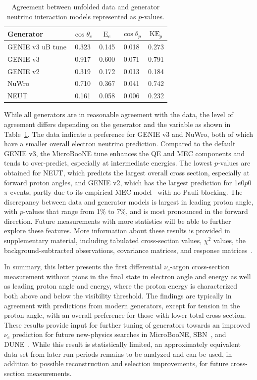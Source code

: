 \documentclass[reprint,
 amsmath,amssymb,
 aps,prd,
 superscriptaddress,
 twocolumn, longbibliography
]{revtex4-1}
\newcommand{\nue}{$\nu_e$\xspace}
\newcommand{\zpsel}{1$e$0$p$0$\pi$\xspace}
\begin{document}
\begin{table}
 \caption{\label{tab:pvals} Agreement between unfolded data and generator neutrino interaction models represented as $p$-values. }
\begin{tabular}{l c c c c} 
 \hline \hline
  Generator & $\cos \theta_{e}$ & $\textrm{E}_{e}$ & $\cos \theta_{p}$ & $\textrm{KE}_{p}$\\ \hline 
 GENIE v3 uB tune & 0.323 & 0.145 & 0.018 & 0.273\\ 
 GENIE v3 & 0.917 & 0.600 & 0.071 & 0.791\\ 
 GENIE v2 & 0.319 & 0.172 & 0.013 & 0.184\\ 
NuWro & 0.710 & 0.367 & 0.041 & 0.742\\ 
NEUT & 0.161 & 0.058 & 0.006 & 0.232\\ 
 \hline \hline
\end{tabular}
\end{table}

While all generators are in reasonable agreement with the data, the level of agreement differs depending on the generator and the variable as shown in Table~\ref{tab:pvals}.
The data indicate a preference for GENIE v3 and NuWro, both of which have a smaller overall electron neutrino prediction.
Compared to the default GENIE v3, the MicroBooNE tune enhances the QE and MEC components and tends to over-predict, especially at intermediate energies. The lowest $p$-values are obtained for NEUT, which predicts the largest overall cross section, especially at forward proton angles, and GENIE v2, which has the largest prediction for \zpsel events, partly due to its empirical MEC model~\cite{Katori:2013eoa} with no Pauli blocking. 
The discrepancy between data and generator models is largest in leading proton angle, with $p$-values that range from 1\% to 7\%, and is most pronounced in the forward direction.  Future measurements with more statistics will be able to further explore these features.
More information about these results is provided in supplementary material, including tabulated cross-section values, $\chi^2$ values, the background-subtracted observations, covariance matrices, and response matrices~\cite{Suppl}.

In summary, this letter presents the first differential \nue-argon cross-section measurement without pions in the final state in electron angle and energy as well as leading proton angle and energy, where the proton energy is characterized both above and below the visibility threshold. 
The findings are typically in agreement with predictions from modern generators, except for tension in the proton angle, with an overall preference for those with lower total cross section.
These results provide input for further tuning of generators towards an improved \nue prediction for future new-physics searches in MicroBooNE, SBN~\cite{SBN}, and DUNE~\cite{DUNE:2020fgq}. While this result is statistically limited, an approximately equivalent data set from later run periods remains to be analyzed and can be used, in addition to possible reconstruction and selection improvements, for future cross-section measurements.
\end{document}
